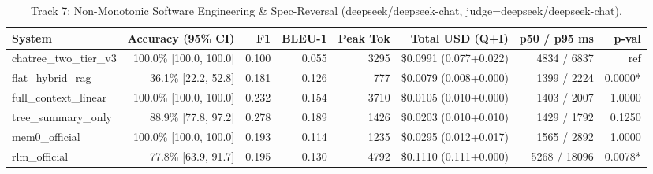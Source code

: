 \begin{table}[t]
\centering
\small
\begin{tabular}{lrrrrrrr}
\toprule
\textbf{System} & \textbf{Accuracy (95\% CI)} & \textbf{F1} & \textbf{BLEU-1} & \textbf{Peak Tok} & \textbf{Total USD (Q+I)} & \textbf{p50 / p95 ms} & \textbf{p-val} \\
\midrule
chatree\_two\_tier\_v3 & 100.0\% [100.0, 100.0] & 0.100 & 0.055 & 3295 & \$0.0991 (0.077+0.022) & 4834 / 6837 & ref \\
flat\_hybrid\_rag & 36.1\% [22.2, 52.8] & 0.181 & 0.126 & 777 & \$0.0079 (0.008+0.000) & 1399 / 2224 & 0.0000* \\
full\_context\_linear & 100.0\% [100.0, 100.0] & 0.232 & 0.154 & 3710 & \$0.0105 (0.010+0.000) & 1403 / 2007 & 1.0000 \\
tree\_summary\_only & 88.9\% [77.8, 97.2] & 0.278 & 0.189 & 1426 & \$0.0203 (0.010+0.010) & 1429 / 1792 & 0.1250 \\
mem0\_official & 100.0\% [100.0, 100.0] & 0.193 & 0.114 & 1235 & \$0.0295 (0.012+0.017) & 1565 / 2892 & 1.0000 \\
rlm\_official & 77.8\% [63.9, 91.7] & 0.195 & 0.130 & 4792 & \$0.1110 (0.111+0.000) & 5268 / 18096 & 0.0078* \\
\bottomrule
\end{tabular}
\caption{Track 7: Non-Monotonic Software Engineering \& Spec-Reversal (deepseek/deepseek-chat, judge=deepseek/deepseek-chat).}
\label{tab:non_monotonic}
\end{table}
